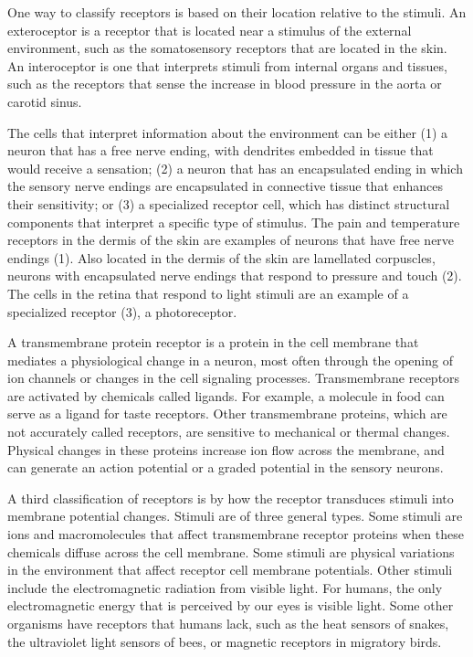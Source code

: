 One way to classify receptors is based on their location relative to the
stimuli. An exteroceptor is a receptor that is located near a stimulus
of the external environment, such as the somatosensory receptors that
are located in the skin. An interoceptor is one that interprets stimuli
from internal organs and tissues, such as the receptors that sense the
increase in blood pressure in the aorta or carotid sinus.

The cells that interpret information about the environment can be either
(1) a neuron that has a free nerve ending, with dendrites embedded in
tissue that would receive a sensation; (2) a neuron that has an
encapsulated ending in which the sensory nerve endings are encapsulated
in connective tissue that enhances their sensitivity; or (3) a
specialized receptor cell, which has distinct structural components that
interpret a specific type of stimulus. The pain and temperature
receptors in the dermis of the skin are examples of neurons that have
free nerve endings (1). Also located in the dermis of the skin are
lamellated corpuscles, neurons with encapsulated nerve endings that
respond to pressure and touch (2). The cells in the retina that respond
to light stimuli are an example of a specialized receptor (3), a
photoreceptor.

A transmembrane protein receptor is a protein in the cell membrane that
mediates a physiological change in a neuron, most often through the
opening of ion channels or changes in the cell signaling processes.
Transmembrane receptors are activated by chemicals called ligands. For
example, a molecule in food can serve as a ligand for taste receptors.
Other transmembrane proteins, which are not accurately called receptors,
are sensitive to mechanical or thermal changes. Physical changes in
these proteins increase ion flow across the membrane, and can generate
an action potential or a graded potential in the sensory neurons.

A third classification of receptors is by how the receptor transduces
stimuli into membrane potential changes. Stimuli are of three general
types. Some stimuli are ions and macromolecules that affect
transmembrane receptor proteins when these chemicals diffuse across the
cell membrane. Some stimuli are physical variations in the environment
that affect receptor cell membrane potentials. Other stimuli include the
electromagnetic radiation from visible light. For humans, the only
electromagnetic energy that is perceived by our eyes is visible light.
Some other organisms have receptors that humans lack, such as the heat
sensors of snakes, the ultraviolet light sensors of bees, or magnetic
receptors in migratory birds.

